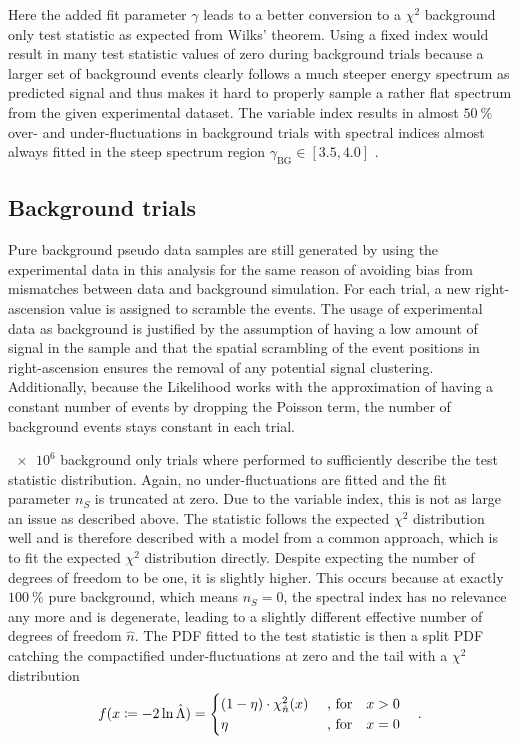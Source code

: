 Here the added fit parameter $\gamma$ leads to a better conversion to a $\chi^2$ background only test statistic as expected from Wilks' theorem.
Using a fixed index would result in many test statistic values of zero during background trials because a larger set of background events clearly follows a much steeper energy spectrum as predicted signal and thus makes it hard to properly sample a rather flat spectrum from the given experimental dataset.
The variable index results in almost $\SI{50}{\percent}$ over- and under-fluctuations in background trials with spectral indices almost always fitted in the steep spectrum region $\gamma_\text{BG}\in[3.5, 4.0]$ .

\subsection*{Background trials}
Pure background pseudo data samples are still generated by using the experimental data in this analysis for the same reason of avoiding bias from mismatches between data and background simulation.
For each trial, a new right-ascension value is assigned to scramble the events.
The usage of experimental data as background is justified by the assumption of having a low amount of signal in the sample and that the spatial scrambling of the event positions in right-ascension ensures the removal of any potential signal clustering.
Additionally, because the Likelihood works with the approximation of having a constant number of events by dropping the Poisson term, the number of background events stays constant in each trial.

$\num{e6}$ background only trials where performed to sufficiently describe the test statistic distribution.
Again, no under-fluctuations are fitted and the fit parameter $n_S$ is truncated at zero.
Due to the variable index, this is not as large an issue as described above.
The statistic follows the expected $\chi^2$ distribution well and is therefore described with a model from a common approach, which is to fit the expected $\chi^2$ distribution directly.
Despite expecting the number of degrees of freedom to be one, it is slightly higher.
This occurs because at exactly $\SI{100}{\percent}$ pure background, which means $n_S=0$, the spectral index has no relevance any more and is degenerate, leading to a slightly different effective number of degrees of freedom $\hat{n}$.
The PDF fitted to the test statistic is then a split PDF catching the compactified under-fluctuations at zero and the tail with a $\chi^2$ distribution 
\begin{equation}
  f(x \coloneqq -2\ln\hat{\Lambda}) =
  \begin{cases}
    (1 - \eta) \cdot \chi^2_{\hat{n}}(x) &\text{ , for}\quad x > 0 \\
    \eta &\text{ , for}\quad x = 0
  \end{cases}
  \quad\text{.}
\end{equation}

